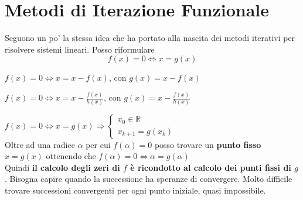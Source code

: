 \documentclass[10pt]{book}
\begin{document}
\section{Metodi di Iterazione Funzionale}
Seguono un po' la stessa idea che ha portato alla nascita dei metodi iterativi per risolvere sistemi lineari. Posso riformulare
$$f(x) = 0 \Leftrightarrow x = g(x)$$
\begin{list}{}{Vari esempi:}
	\item $f(x) = 0 \Leftrightarrow x = x - f(x)$, con $g(x) = x - f(x)$
	\item $f(x) = 0 \Leftrightarrow x = x - \frac{f(x)}{h(x)}$, con $g(x) = x - \frac{f(x)}{h(x)}$
\end{list}
$f(x) = 0 \Leftrightarrow x = g(x) \Rightarrow \left\{\begin{array}{l}
x_0 \in \mathbb{R}\\
x_{k+1} = g(x_k)
\end{array}\right.$\\Oltre ad una radice $\alpha$ per cui $f(\alpha) = 0$ posso trovare un \textbf{punto fisso} $x = g(x)$ ottenendo che $f(\alpha) = 0 \Leftrightarrow \alpha = g(\alpha)$\\Quindi \textbf{il calcolo degli zeri di $f$ è ricondotto al calcolo dei punti fissi di $g$}. Bisogna capire quando la successione ha speranze di convergere. Molto difficile trovare successioni convergenti per ogni punto iniziale, quasi impossibile.
\end{document}
